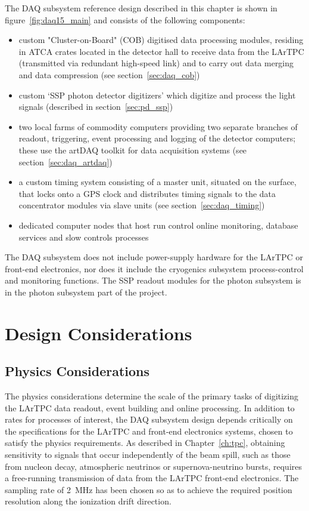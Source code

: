 The DAQ subsystem reference design described in this chapter is shown
in figure~\ref{fig:daq15_main} and consists of the following
components:
\begin{itemize}
  \item custom "Cluster-on-Board" (COB) digitised data processing
    modules, residing in ATCA crates located in the detector hall to
    receive data from the LArTPC (transmitted via redundant high-speed
    link) and to carry out data merging and data compression (see
    section~\ref{sec:daq_cob})
  \item custom `SSP photon detector digitizers' which digitize and
    process the light signals (described in section~\ref{sec:pd_ssp}) 
  \item two local farms of commodity computers providing two separate
    branches of readout, triggering, event processing and logging of the
    detector computers; these use the artDAQ toolkit for data
    acquisition systems (see section~\ref{sec:daq_artdaq})
  \item a custom timing system consisting of a master unit, situated
    on the surface, that locks onto a GPS clock and distributes timing
    signals to the data concentrator modules via slave units (see
    section~\ref{sec:daq_timing})
  \item dedicated computer nodes that host run control online
    monitoring, database services and slow controls processes
\end{itemize}
%
The DAQ subsystem does not include power-supply hardware for the
LArTPC or front-end electronics, nor does it include the cryogenics
subsystem process-control and monitoring functions.  The SSP readout
modules for the photon subsystem is in the photon subsystem part of
the project.

\section{Design Considerations}

\subsection{Physics Considerations}

The physics considerations determine the scale of the primary tasks of
digitizing the LArTPC data readout, event building and online
processing.  In addition to rates for processes of interest, the DAQ
subsystem design depends critically on the specifications for the
LArTPC and front-end electronics systems, chosen to satisfy the \LBNE
physics requirements.  As described in Chapter~\ref{ch:tpc}, obtaining
sensitivity to signals that occur independently of the \LBNE beam
spill, such as those from nucleon decay, atmospheric neutrinos or
supernova-neutrino bursts, requires a free-running transmission of
data from the LArTPC front-end electronics.  The sampling rate of
2~MHz has been chosen so as to achieve the required position
resolution along the ionization drift direction.

